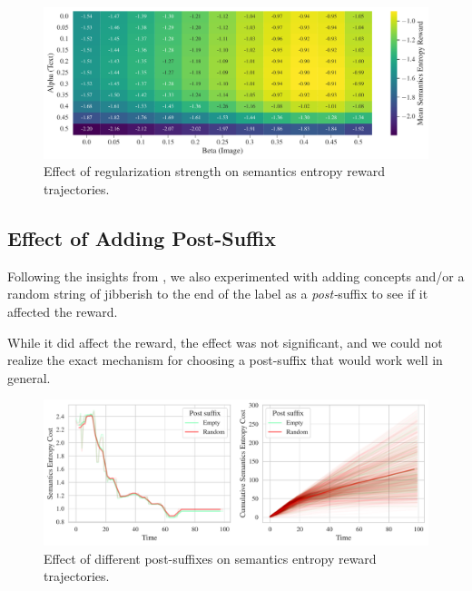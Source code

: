 \begin{figure}[H]
    \centering
    \includegraphics[width=\textwidth]{images/alpha_beta_temp12avg_noneg.pdf}
    \caption{Effect of regularization strength on semantics entropy reward trajectories.}
    \label{fig:clip-alpha-beta}
\end{figure}




\subsection{Effect of Adding Post-Suffix}
\label{sec:post-suffix}
Following the insights from \cite{waffleclip}, we also experimented with adding concepts and/or a random string of jibberish to the end of the label as a \emph{post-}suffix to see if it affected the reward. 

While it did affect the reward, the effect was not significant, and we could not realize the exact mechanism for choosing a post-suffix that would work well in general.

\begin{figure}[H]
    \centering
    \includegraphics[width=\textwidth]{images/post_suffix_comparison.pdf}
    \caption{Effect of different post-suffixes on semantics entropy reward trajectories.}
    \label{fig:post-suffix}
\end{figure}


